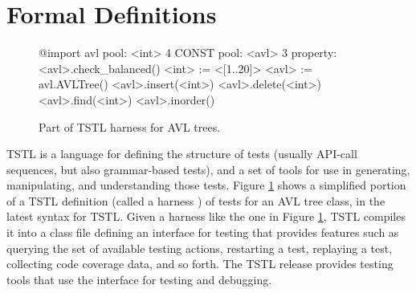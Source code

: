 \section{Formal Definitions}


\begin{figure}[t]
{\scriptsize
\begin{code}
@import avl
\vspace{0.02in}
pool: <int> 4 CONST
pool: <avl> 3
\vspace{0.02in}
property: <avl>.check\_balanced()
\vspace{0.02in}
<int> := <[1..20]>
<avl> := avl.AVLTree()
\vspace{0.02in}
<avl>.insert(<int>)
<avl>.delete(<int>)
<avl>.find(<int>)
<avl>.inorder()
\end{code}
}
\caption{Part of TSTL harness for AVL trees.}
\label{fig:example}
\end{figure}


TSTL \cite{NFM15,ISSTA15,tstlsttt} is a language for defining the structure of
tests (usually API-call sequences, but also grammar-based tests), and a set of tools for use in generating,
manipulating, and understanding those tests.  Figure
\ref{fig:example} shows a simplified portion of a TSTL definition
(called a harness \cite{WODA08,WODACommon}) of
tests for an AVL tree class, in the latest syntax for TSTL.
Given a harness
like the one in Figure \ref{fig:example}, TSTL compiles it into a
class file defining an interface for testing that provides features
such as querying the set of available testing actions, restarting a
test, replaying a test, collecting code coverage data, and so forth.
The TSTL release \cite{tstl} provides testing tools that use the
interface for testing and debugging.

